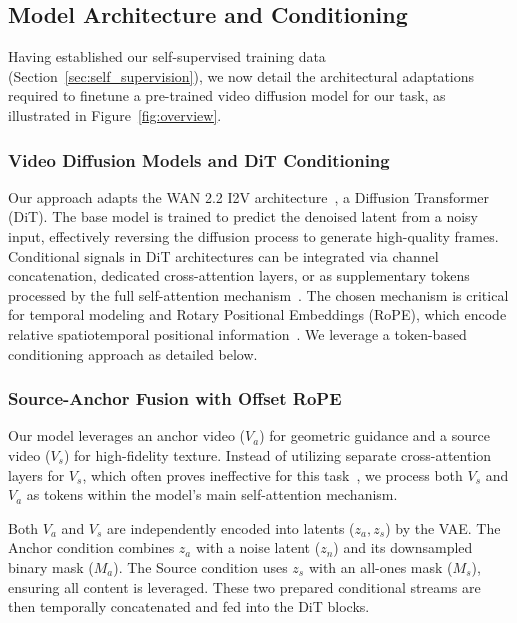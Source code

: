 \subsection{Model Architecture and Conditioning}
\label{sec:architecture}


Having established our self-supervised training data (Section~\ref{sec:self_supervision}), we now detail the architectural adaptations required to finetune a pre-trained video diffusion model for our task, as illustrated in Figure~\ref{fig:overview}.

\subsubsection{Video Diffusion Models and DiT Conditioning}
\label{sec:arch_background}

Our approach adapts the WAN 2.2 I2V architecture~\cite{wan21}, a Diffusion Transformer (DiT). The base model is trained to predict the denoised latent from a noisy input, effectively reversing the diffusion process to generate high-quality frames. Conditional signals in DiT architectures can be integrated via channel concatenation, dedicated cross-attention layers, or as supplementary tokens processed by the full self-attention mechanism~\cite{bai2025recammaster, peebles2023scalable}. The chosen mechanism is critical for temporal modeling and Rotary Positional Embeddings (RoPE), which encode relative spatiotemporal positional information~\cite{bai2025recammaster, su2024roformer}. We leverage a token-based conditioning approach as detailed below.

\subsubsection{Source-Anchor Fusion with Offset RoPE}
\label{sec:offset_rope}

Our model leverages an anchor video ($V_a$) for geometric guidance and a source video ($V_s$) for high-fidelity texture. Instead of utilizing separate cross-attention layers for $V_s$, which often proves ineffective for this task~\cite{bai2025recammaster}, we process both $V_s$ and $V_a$ as tokens within the model's main self-attention mechanism.

Both $V_a$ and $V_s$ are independently encoded into latents ($z_a, z_s$) by the VAE. The Anchor condition combines $z_a$ with a noise latent ($z_n$) and its downsampled binary mask ($M_a$). The Source condition uses $z_s$ with an all-ones mask ($M_s$), ensuring all content is leveraged. These two prepared conditional streams are then temporally concatenated and fed into the DiT blocks.

